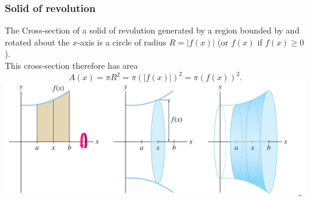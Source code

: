 \begin{frame}\frametitle{Solid of revolution }
The Cross-section of a solid of revolution generated by a region bounded by and rotated about the $ x $-axis is a circle of radius $ R = |f(x)| $ (or $ f(x) $ if $ f(x)\ge 0 $).\\
This cross-section therefore has area \[A(x)=\pi R^2=  \pi \left(|f(x)|\right)^2 =  \pi \left(f(x)\right)^2. \]
{\includegraphics[width=.9\textwidth]{volumes/pictures/solid1}}
\end{frame}